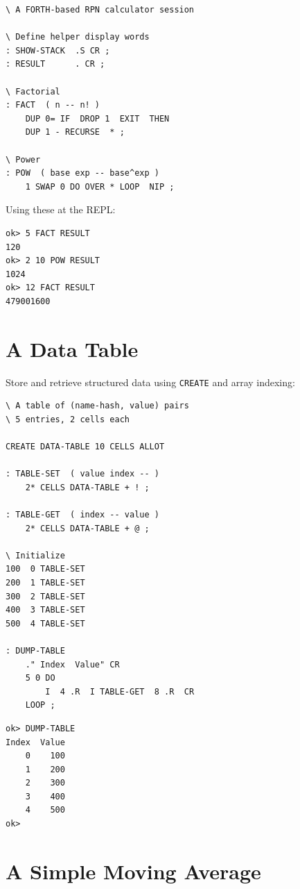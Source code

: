 \begin{lstlisting}[language=Forth]
\ A FORTH-based RPN calculator session

\ Define helper display words
: SHOW-STACK  .S CR ;
: RESULT      . CR ;

\ Factorial
: FACT  ( n -- n! )
    DUP 0= IF  DROP 1  EXIT  THEN
    DUP 1 - RECURSE  * ;

\ Power
: POW  ( base exp -- base^exp )
    1 SWAP 0 DO OVER * LOOP  NIP ;
\end{lstlisting}

Using these at the REPL:

\begin{lstlisting}[language=Forth]
ok> 5 FACT RESULT
120
ok> 2 10 POW RESULT
1024
ok> 12 FACT RESULT
479001600
\end{lstlisting}

\section{A Data Table}
\label{sec:example-data-table}

Store and retrieve structured data using \texttt{CREATE} and array indexing:

\begin{lstlisting}[language=Forth]
\ A table of (name-hash, value) pairs
\ 5 entries, 2 cells each

CREATE DATA-TABLE 10 CELLS ALLOT

: TABLE-SET  ( value index -- )
    2* CELLS DATA-TABLE + ! ;

: TABLE-GET  ( index -- value )
    2* CELLS DATA-TABLE + @ ;

\ Initialize
100  0 TABLE-SET
200  1 TABLE-SET
300  2 TABLE-SET
400  3 TABLE-SET
500  4 TABLE-SET

: DUMP-TABLE
    ." Index  Value" CR
    5 0 DO
        I  4 .R  I TABLE-GET  8 .R  CR
    LOOP ;
\end{lstlisting}

\begin{lstlisting}[language=Forth]
ok> DUMP-TABLE
Index  Value
    0    100
    1    200
    2    300
    3    400
    4    500
ok>
\end{lstlisting}

\section{A Simple Moving Average}
\label{sec:example-moving-average}

